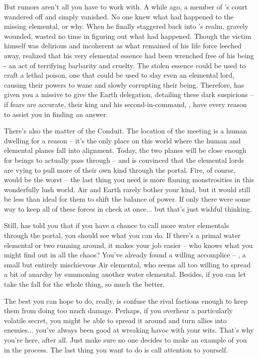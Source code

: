 \documentclass[char]{elementals}
\begin{document}
But rumors aren't all you have to work with. A while ago, a member of \cWaterQueen{}'s court wandered off and simply vanished. No one knew what had happened to the missing elemental, or why. When he finally staggered back into \cWaterQueen{}'s realm, gravely wounded, \cWaterQueen{\they} wasted no time in figuring out what had happened. Though the victim himself was delirious and incoherent as what remained of his life force leeched away, \cWaterQueen{} realized that his very elemental essence had been wrenched free of his being - an act of terrifying barbarity and cruelty. The stolen essence could be used to craft a lethal poison, one that could be used to slay even an elemental lord, causing their powers to wane and slowly corrupting their being. Therefore, \cWaterQueen{} has given you a missive to give the Earth delegation, detailing these dark suspicions -- if \cWaterQueen{\their} fears are accurate, their king and his second-in-command, \cLoyal{\intro}, have every reason to assist you in finding an answer. 

There's also the matter of the Conduit. The location of the meeting is a human dwelling for a reason -- it's the only place on this world where the human and elemental planes fall into alignment. Today, the two planes will be close enough for beings to actually pass through -- and \cWaterQueen{} is convinced that the elemental lords are vying to pull more of their own kind through the portal. Fire, of course, would be the worst -- the last thing you need is more flaming monstrosities in this wonderfully lush world. Air and Earth rarely bother your kind, but it would still be less than ideal for them to shift the balance of power. If only there were some way to keep all of these forces in check at once... but that's just wishful thinking. 

Still, \cWaterQueen{} has told you that if you have a chance to call more water elementals through the portal, you should see what you can do. If there's a primal water elemental or two running around, it makes your job easier -- who knows what you might find out in all the chaos? You've already found a willing accomplice -- \cMiniAir{\intro}, a small but entirely mischievous Air elemental, who seems all too willing to spread a bit of anarchy by summoning another water elemental. Besides, if you can let \cMiniAir{\them} take the fall for the whole thing, so much the better.

The best you can hope to do, really, is confuse the rival factions enough to keep them from doing too much damage. Perhaps, if you overhear a particularly volatile secret, you might be able to spread it around and turn allies into enemies... you've always been good at wreaking havoc with your wits. That's why you're here, after all. Just make sure no one decides to make an example of you in the process. The last thing you want to do is call attention to yourself.
\end{document}
